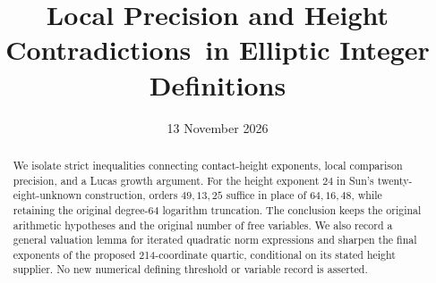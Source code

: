 \documentclass[11pt,a4paper]{article}
\title{Local Precision and Height Contradictions\ in Elliptic Integer Definitions}
\author{}\date{13 November 2026}
\begin{document}
\maketitle
\begin{abstract}
We isolate strict inequalities connecting contact-height exponents,
local comparison precision, and a Lucas growth argument. For the
height exponent $24$ in Sun's twenty-eight-unknown construction,
orders $49,13,25$ suffice in place of $64,16,48$, while retaining the
original degree-$64$ logarithm truncation. The conclusion keeps the
original arithmetic hypotheses and the original number of free variables.
We also record a general valuation lemma for iterated quadratic norm
expressions and sharpen the final exponents of the proposed
214-coordinate quartic, conditional on its stated height supplier.
No new numerical defining threshold or variable record is asserted.
\end{abstract}
\end{document}

